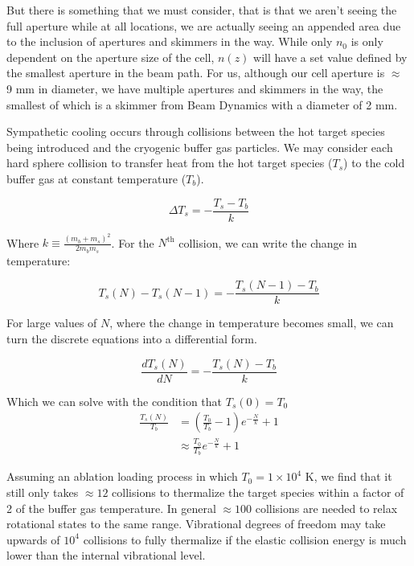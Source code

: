 But there is something that we must consider, that is that we aren't seeing the full aperture while at all locations, we are actually seeing an appended area due to the inclusion of apertures and skimmers in the way. While only $n_0$ is only dependent on the aperture size of the cell, $n(z)$ will have a set value defined by the smallest aperture in the beam path. For us, although our cell aperture is $\approx$ 9 mm in diameter, we have multiple apertures and skimmers in the way, the smallest of which is a skimmer from Beam Dynamics with a diameter of 2 mm.

Sympathetic cooling occurs through collisions between the hot target species being introduced and the cryogenic buffer gas particles. We may consider each hard sphere collision to transfer heat from the hot target species ($T_s$) to the cold buffer gas at constant temperature ($T_b$).

\begin{equation*}
	\Delta T_s = -\frac{T_s - T_b}{k}
\end{equation*}

Where $k \equiv \frac{(m_b + m_s)^2}{2 m_b m_s}$. For the $N^{\text{th}}$ collision, we can write the change in temperature:

\begin{equation*}
	T_s(N) - T_s(N-1) = -\frac{T_s(N-1)-T_b}{k}
\end{equation*}

For large values of $N$, where the change in temperature becomes small, we can turn the discrete equations into a differential form.

\begin{equation*}
	\frac{d T_s(N)}{dN} = -\frac{T_s(N) - T_b}{k}
\end{equation*}

Which we can solve with the condition that $T_s(0)=T_0$
\begin{align*}
	\frac{T_s(N)}{T_b} & = \left(\frac{T_0}{T_b} - 1\right)e^{-\frac{N}{k}} +1 \\
	& \approx \frac{T_0}{T_b}e^{-\frac{N}{k}} + 1
\end{align*}

Assuming an ablation loading process in which $T_0=1 \times 10^4$ K, we find that it still only takes $\approx 12$ collisions to thermalize the target species within a factor of 2 of the buffer gas temperature. In general $\approx 100$ collisions are needed to relax rotational states to the same range. Vibrational degrees of freedom may take upwards of $10^4$ collisions to fully thermalize if the elastic collision energy is much lower than the internal vibrational level.

